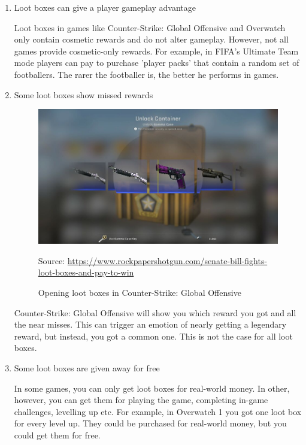 \documentclass[10pt,twoside,english,a4paper]{coursepaper}
\newcommand{\source}[1]{\caption*{Source: {#1}} }
\begin{document}
\begin{enumerate}

\item Loot boxes can give a player gameplay advantage

	Loot boxes in games like Counter-Strike: Global Offensive and Overwatch only contain cosmetic rewards and do not alter gameplay. However, not all games provide cosmetic-only rewards. For example, in FIFA's Ultimate Team mode players can pay to purchase 'player packs' that contain a random set of footballers. The rarer the footballer is, the better he performs in games.\cite{fifa:lootboxes}

\item Some loot boxes show missed rewards
	
\begin{figure}[tbh]
	\centering
	\includegraphics[scale=0.33]{img2}
	\caption{Opening loot boxes in Counter-Strike: Global Offensive}
	\source{\url{https://www.rockpapershotgun.com/senate-bill-fights-loot-boxes-and-pay-to-win} }
	\label{fig:img2}
\end{figure}
	
	Counter-Strike: Global Offensive will show you which reward you got and all the near misses. This can trigger an emotion of nearly getting a legendary reward, but instead, you got a common one. This is not the case for all loot boxes.

\item Some loot boxes are given away for free

	In some games, you can only get loot boxes for real-world money. In other, however, you can get them for playing the game, completing in-game challenges, levelling up etc. For example, in Overwatch 1 you got one loot box for every level up. They could be purchased for real-world money, but you could get them for free. 


\end{enumerate}
\end{document}

